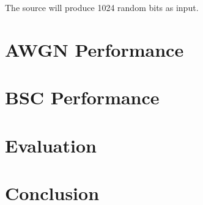 \documentclass[conference,a4paper]{IEEEtran}
\begin{document}
The source will produce 1024 random bits as input.

\vspace{7pt}
\section{AWGN Performance}


\vspace{7pt}
\section{BSC Performance}


\vspace{7pt}
\section{Evaluation}


\vspace{7pt}
\section{Conclusion}



%
%

\end{document}
